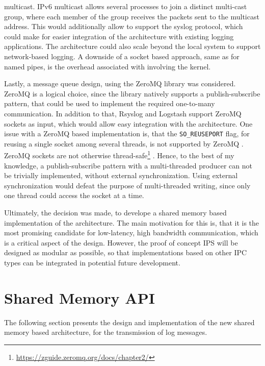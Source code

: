 multicast. \ac{IPv6} multicast allows several processes to join a distinct multi-cast group, where each member of the group receives the packets sent to the multicast address. This would additionally
allow to support the syslog protocol, which could make for easier integration of the architecture with existing logging applications. The architecture could also scale beyond the local system to support 
network-based logging. A downside of a socket based approach, same as for named pipes, is the overhead associated with involving the kernel.
\par 
Lastly, a message queue design, using the ZeroMQ library was considered. ZeroMQ is a logical choice, since the library natively supports a publish-subscribe pattern, that could be used to
implement the required one-to-many communication. In addition to that, Rsyslog and Logstash support ZeroMQ sockets as input, which would allow easy integration with the architecture.
One issue with a ZeroMQ based implementation is, that the \texttt{SO\_REUSEPORT} flag, for reusing a single socket among several threads, is not supported by ZeroMQ \cite{zeromq_issue}. 
ZeroMQ sockets are not otherwise thread-safe\footnote{\url{https://zguide.zeromq.org/docs/chapter2/}} \cite{zeromq}. Hence, to the best of my knowledge, a publish-subscribe pattern with a 
multi-threaded producer can not be trivially implemented, without external synchronization. Using external synchronization would defeat the purpose of multi-threaded
writing, since only one thread could access the socket at a time. 
\par 
Ultimately, the decision was made, to develope a shared memory based implementation of the architecture. The main motivation for this is, that it is the most promising
candidate for low-latency, high bandwidth communication, which is a critical aspect of the design. However, the proof of concept \ac{IPS} will be designed as modular as possible, so
that implementations based on other \ac{IPC} types can be integrated in potential future development. 

\section{Shared Memory API}

The following section presents the design and implementation of the new shared memory based architecture, for the transmission
of log messages. 

